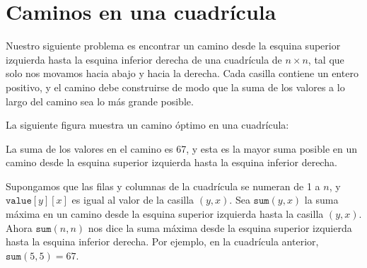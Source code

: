 \section{Caminos en una cuadrícula}

Nuestro siguiente problema es encontrar un camino
desde la esquina superior izquierda hasta
la esquina inferior derecha
de una cuadrícula de $n \times n$, tal que
solo nos movamos hacia abajo y hacia la derecha.
Cada casilla contiene un entero positivo,
y el camino debe construirse de modo
que la suma de los valores a lo largo
del camino sea lo más grande posible.

La siguiente figura muestra un camino
óptimo en una cuadrícula:
\begin{center}
\end{center}
La suma de los valores en el camino es 67,
y esta es la mayor suma posible en un camino
desde la
esquina superior izquierda hasta la esquina inferior derecha.

Supongamos que las filas y columnas de la
cuadrícula se numeran de 1 a $n$,
y $\texttt{value}[y][x]$ es igual al valor
de la casilla $(y,x)$.
Sea $\texttt{sum}(y,x)$ la
suma máxima en un camino desde la esquina superior izquierda
hasta la casilla $(y,x)$.
Ahora $\texttt{sum}(n,n)$ nos dice
la suma máxima
desde la esquina superior izquierda hasta
la esquina inferior derecha.
Por ejemplo, en la cuadrícula anterior,
$\texttt{sum}(5,5)=67$.

